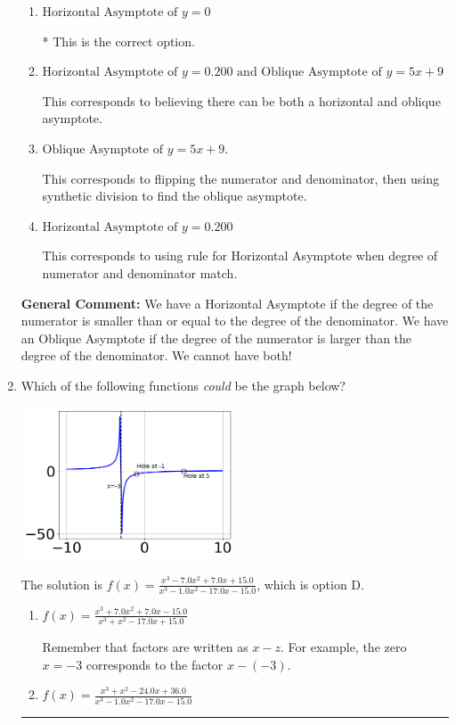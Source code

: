 \documentclass{extbook}[14pt]
\newcommand{\litem}[1]{\item #1

\rule{\textwidth}{0.4pt}}
\begin{document}
\begin{enumerate}
{\begin{enumerate}[label=\Alph*.]
This corresponds to considering where the denominator is equal to 0 as horizontal asymptote.
\item \( \text{Horizontal Asymptote of } y = 0 \)

* This is the correct option.
\item \( \text{Horizontal Asymptote of } y = 0.200 \text{ and Oblique Asymptote of } y = 5x + 9 \)

This corresponds to believing there can be both a horizontal and oblique asymptote.
\item \( \text{Oblique Asymptote of } y = 5x + 9. \)

This corresponds to flipping the numerator and denominator, then using synthetic division to find the oblique asymptote.
\item \( \text{Horizontal Asymptote of } y = 0.200  \)

This corresponds to using rule for Horizontal Asymptote when degree of numerator and denominator match.
\end{enumerate}

\textbf{General Comment:} We have a Horizontal Asymptote if the degree of the numerator is smaller than or equal to the degree of the denominator. We have an Oblique Asymptote if the degree of the numerator is larger than the degree of the denominator. We cannot have both!
}
\litem{
Which of the following functions \textit{could} be the graph below?

\begin{center}
    \includegraphics[width=0.5\textwidth]{../Figures/identifyGraphOfRationalFunctionB.png}
\end{center}


The solution is \( f(x)=\frac{x^{3} -7.0 x^{2} +7.0 x + 15.0}{x^{3} -1.0 x^{2} -17.0 x -15.0} \), which is option D.\begin{enumerate}[label=\Alph*.]
\item \( f(x)=\frac{x^{3} +7.0 x^{2} +7.0 x -15.0}{x^{3} + x^{2} -17.0 x + 15.0} \)

Remember that factors are written as $x-z$. For example, the zero $x=-3$ corresponds to the factor $x-(-3)$.
\item \( f(x)=\frac{x^{3} + x^{2} -24.0 x + 36.0}{x^{3} -1.0 x^{2} -17.0 x -15.0} \)


\end{enumerate}}
\end{enumerate}
\end{document}
